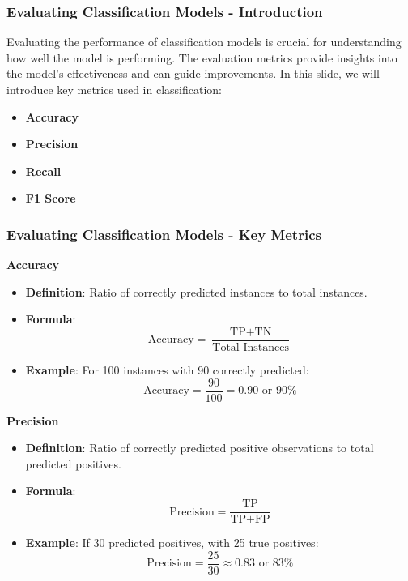 \documentclass{beamer}
\begin{document}
\begin{frame}[fragile]
    \frametitle{Evaluating Classification Models - Introduction}
    Evaluating the performance of classification models is crucial for understanding how well the model is performing. 
    The evaluation metrics provide insights into the model's effectiveness and can guide improvements. 
    In this slide, we will introduce key metrics used in classification: 
    \begin{itemize}
        \item \textbf{Accuracy}
        \item \textbf{Precision}
        \item \textbf{Recall}
        \item \textbf{F1 Score}
    \end{itemize}
\end{frame}

\begin{frame}[fragile]
    \frametitle{Evaluating Classification Models - Key Metrics}
    \textbf{Accuracy}
    \begin{itemize}
        \item \textbf{Definition}: Ratio of correctly predicted instances to total instances.
        \item \textbf{Formula}: 
        \begin{equation}
        \text{Accuracy} = \frac{\text{TP} + \text{TN}}{\text{Total Instances}} 
        \end{equation}
        \item \textbf{Example}: For 100 instances with 90 correctly predicted:
        \begin{equation}
        \text{Accuracy} = \frac{90}{100} = 0.90 \text{ or } 90\%
        \end{equation}
    \end{itemize}

    \textbf{Precision}
    \begin{itemize}
        \item \textbf{Definition}: Ratio of correctly predicted positive observations to total predicted positives.
        \item \textbf{Formula}: 
        \begin{equation}
        \text{Precision} = \frac{\text{TP}}{\text{TP} + \text{FP}} 
        \end{equation}
        \item \textbf{Example}: If 30 predicted positives, with 25 true positives:
        \begin{equation}
        \text{Precision} = \frac{25}{30} \approx 0.83 \text{ or } 83\%
        \end{equation}
    \end{itemize}
\end{frame}
\end{document}
